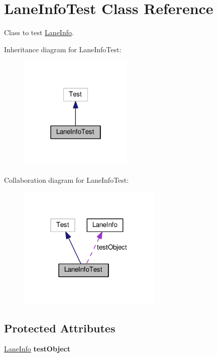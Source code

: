 \hypertarget{classLaneInfoTest}{}\section{Lane\+Info\+Test Class Reference}
\label{classLaneInfoTest}


Class to test \hyperlink{classLaneInfo}{Lane\+Info}.  




Inheritance diagram for Lane\+Info\+Test\+:
\nopagebreak
\begin{figure}[H]
\begin{center}
\leavevmode
\includegraphics[width=154pt]{classLaneInfoTest__inherit__graph}
\end{center}
\end{figure}


Collaboration diagram for Lane\+Info\+Test\+:
\nopagebreak
\begin{figure}[H]
\begin{center}
\leavevmode
\includegraphics[width=195pt]{classLaneInfoTest__coll__graph}
\end{center}
\end{figure}
\subsection*{Protected Attributes}
\begin{DoxyCompactItemize}
\item 
\hyperlink{classLaneInfo}{Lane\+Info} {\bfseries test\+Object}\hypertarget{classLaneInfoTest_af4d53427a1f10dbc4b6668513e6febc8}{}\label{classLaneInfoTest_af4d53427a1f10dbc4b6668513e6febc8}

\end{DoxyCompactItemize}


